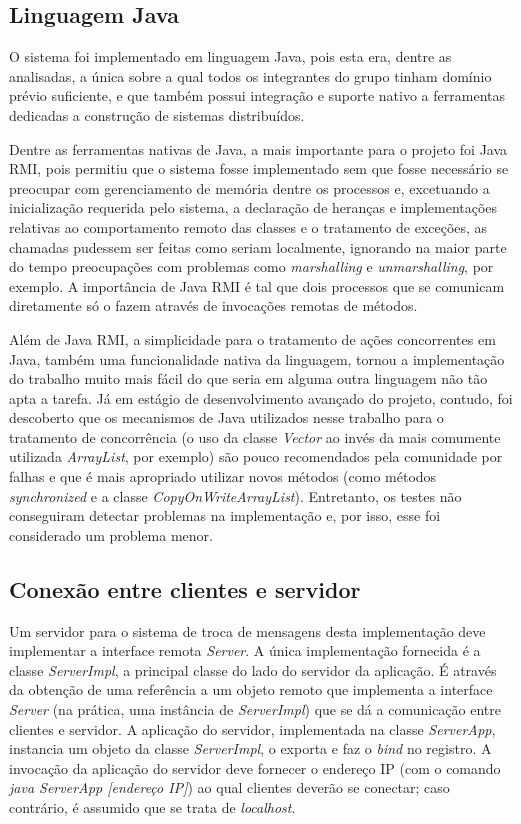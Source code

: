\documentclass[../main.tex]{subfiles}
\begin{document}
\subsection{Linguagem Java}

O sistema foi implementado em linguagem Java, pois esta era, dentre as analisadas, a única sobre a qual todos os integrantes do grupo tinham domínio prévio suficiente, e que também possui integração e suporte nativo a ferramentas dedicadas a construção de sistemas distribuídos.

Dentre as ferramentas nativas de Java, a mais importante para o projeto foi Java RMI, pois permitiu que o sistema fosse implementado sem que fosse necessário se preocupar com gerenciamento de memória dentre os processos e, excetuando a inicialização requerida pelo sistema, a declaração de heranças e implementações relativas ao comportamento remoto das classes e o tratamento de exceções, as chamadas pudessem ser feitas como seriam localmente, ignorando na maior parte do tempo preocupações com problemas como \textit{marshalling} e \textit{unmarshalling}, por exemplo.
A importância de Java RMI é tal que dois processos que se comunicam diretamente só o fazem através de invocações remotas de métodos.

Além de Java RMI, a simplicidade para o tratamento de ações concorrentes em Java, também uma funcionalidade nativa da linguagem, tornou a implementação do trabalho muito mais fácil do que seria em alguma outra linguagem não tão apta a tarefa.
Já em estágio de desenvolvimento avançado do projeto, contudo, foi descoberto que os mecanismos de Java utilizados nesse trabalho para o tratamento de concorrência (o uso da classe \textit{Vector} ao invés da mais comumente utilizada \textit{ArrayList}, por exemplo) são pouco recomendados pela comunidade por falhas e que é mais apropriado utilizar novos métodos (como métodos \textit{synchronized} e a classe \textit{CopyOnWriteArrayList}).
Entretanto, os testes não conseguiram detectar problemas na implementação e, por isso, esse foi considerado um problema menor.

\subsection{Conexão entre clientes e servidor}

Um servidor para o sistema de troca de mensagens desta implementação deve implementar a interface remota \textit{Server}.
A única implementação fornecida é a classe \textit{ServerImpl}, a principal classe do lado do servidor da aplicação.
É através da obtenção de uma referência a um objeto remoto que implementa a interface \textit{Server} (na prática, uma instância de \textit{ServerImpl}) que se dá a comunicação entre clientes e servidor.
A aplicação do servidor, implementada na classe \textit{ServerApp}, instancia um objeto da classe \textit{ServerImpl}, o exporta e faz o \textit{bind} no registro.
A invocação da aplicação do servidor deve fornecer o endereço IP (com o comando \textit{java ServerApp [endereço IP]}) ao qual clientes deverão se conectar; caso contrário, é assumido que se trata de \textit{localhost}.
\end{document}
